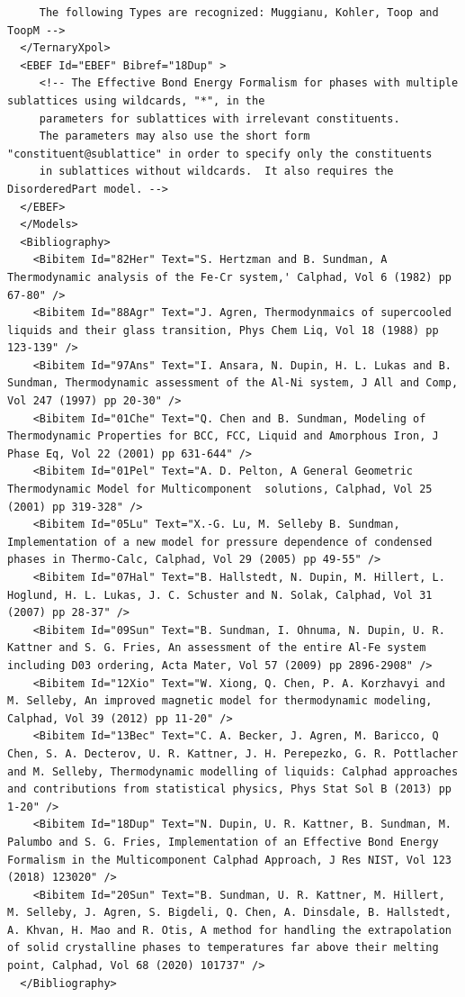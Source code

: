 \documentclass{article}
\begin{document}
\begin{appendices}
{\begin{verbatim}
     The following Types are recognized: Muggianu, Kohler, Toop and ToopM -->
  </TernaryXpol>
  <EBEF Id="EBEF" Bibref="18Dup" > 
     <!-- The Effective Bond Energy Formalism for phases with multiple sublattices using wildcards, "*", in the
     parameters for sublattices with irrelevant constituents.
     The parameters may also use the short form "constituent@sublattice" in order to specify only the constituents
     in sublattices without wildcards.  It also requires the DisorderedPart model. -->
  </EBEF>
  </Models>
  <Bibliography> 
    <Bibitem Id="82Her" Text="S. Hertzman and B. Sundman, A Thermodynamic analysis of the Fe-Cr system,' Calphad, Vol 6 (1982) pp 67-80" />
    <Bibitem Id="88Agr" Text="J. Agren, Thermodynmaics of supercooled liquids and their glass transition, Phys Chem Liq, Vol 18 (1988) pp 123-139" />
    <Bibitem Id="97Ans" Text="I. Ansara, N. Dupin, H. L. Lukas and B. Sundman, Thermodynamic assessment of the Al-Ni system, J All and Comp, Vol 247 (1997) pp 20-30" />
    <Bibitem Id="01Che" Text="Q. Chen and B. Sundman, Modeling of Thermodynamic Properties for BCC, FCC, Liquid and Amorphous Iron, J Phase Eq, Vol 22 (2001) pp 631-644" />
    <Bibitem Id="01Pel" Text="A. D. Pelton, A General Geometric Thermodynamic Model for Multicomponent  solutions, Calphad, Vol 25 (2001) pp 319-328" />
    <Bibitem Id="05Lu" Text="X.-G. Lu, M. Selleby B. Sundman, Implementation of a new model for pressure dependence of condensed phases in Thermo-Calc, Calphad, Vol 29 (2005) pp 49-55" />
    <Bibitem Id="07Hal" Text="B. Hallstedt, N. Dupin, M. Hillert, L. Hoglund, H. L. Lukas, J. C. Schuster and N. Solak, Calphad, Vol 31 (2007) pp 28-37" />
    <Bibitem Id="09Sun" Text="B. Sundman, I. Ohnuma, N. Dupin, U. R. Kattner and S. G. Fries, An assessment of the entire Al-Fe system including D03 ordering, Acta Mater, Vol 57 (2009) pp 2896-2908" />
    <Bibitem Id="12Xio" Text="W. Xiong, Q. Chen, P. A. Korzhavyi and M. Selleby, An improved magnetic model for thermodynamic modeling, Calphad, Vol 39 (2012) pp 11-20" />
    <Bibitem Id="13Bec" Text="C. A. Becker, J. Agren, M. Baricco, Q Chen, S. A. Decterov, U. R. Kattner, J. H. Perepezko, G. R. Pottlacher and M. Selleby, Thermodynamic modelling of liquids: Calphad approaches and contributions from statistical physics, Phys Stat Sol B (2013) pp 1-20" />
    <Bibitem Id="18Dup" Text="N. Dupin, U. R. Kattner, B. Sundman, M. Palumbo and S. G. Fries, Implementation of an Effective Bond Energy Formalism in the Multicomponent Calphad Approach, J Res NIST, Vol 123 (2018) 123020" />
    <Bibitem Id="20Sun" Text="B. Sundman, U. R. Kattner, M. Hillert, M. Selleby, J. Agren, S. Bigdeli, Q. Chen, A. Dinsdale, B. Hallstedt, A. Khvan, H. Mao and R. Otis, A method for handling the extrapolation of solid crystalline phases to temperatures far above their melting point, Calphad, Vol 68 (2020) 101737" />
  </Bibliography>


\end{verbatim}}
\end{appendices}
\end{document}
